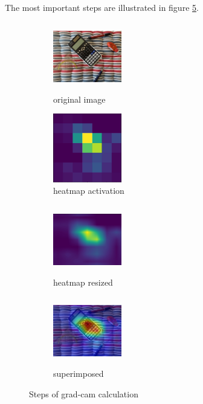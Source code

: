 \documentclass[../ImageClassifier.tex]{subfiles}
\begin{document}
    The most important steps are illustrated in figure \ref{fig:grad-cam-process}.
    \begin{figure}[ht!]
      \begin{subfigure}{.24\textwidth}
        \centering
        \includegraphics[height=3cm, width=3cm]{./attachments/grad_cam/heatmap_orig.jpg}
        \caption{original image}
        \label{fig:original image}
      \end{subfigure}%
      \begin{subfigure}{.24\textwidth}
        \centering
        \includegraphics[height=3cm, width=3cm]{./attachments/grad_cam/heatmap.jpg}
        \caption{heatmap activation}
        \label{fig:heatmap activasion}
      \end{subfigure}
      \begin{subfigure}{.24\textwidth}
          \centering
          \includegraphics[height=3cm, width=3cm]{./attachments/grad_cam/resized_heatmap.jpg}
          \caption{heatmap resized}
          \label{fig:heatmap resized}
        \end{subfigure}
        \begin{subfigure}{.24\textwidth}
          \centering
          \includegraphics[height=3cm, width=3cm]{./attachments/grad_cam/heatmap_final.jpg}
          \caption{superimposed}
          \label{fig:superimposed image}
        \end{subfigure}
      \caption{Steps of \ac{grad-cam} calculation}
      \label{fig:grad-cam-process}
    \end{figure}
\end{document}
